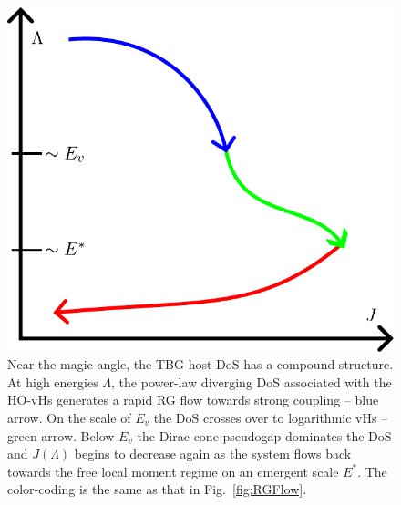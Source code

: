 \begin{figure}[t]
        \centering
	\includegraphics[width=0.4\linewidth]{figures/chapter2/RGFlowColors.pdf}
	\caption{
		  Near the magic angle, the TBG host DoS has a compound structure. At high energies $\Lambda$, the power-law diverging DoS associated with the HO-vHs generates a rapid RG flow towards strong coupling -- blue arrow. On the scale of $E_v$ the DoS crosses over to logarithmic vHs -- green arrow. Below $E_v$ the Dirac cone pseudogap dominates the DoS and $J(\Lambda)$ begins to decrease again as the system flows back towards the free local moment regime on an emergent scale $E^*$. The color-coding is the same as that in Fig.~\ref{fig:RGFlow}.}
	\label{fig:flow}
\end{figure}



